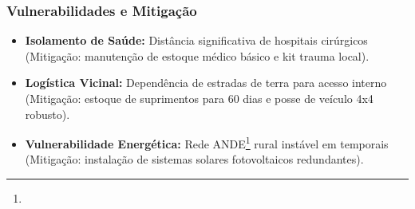 \subsubsection{Vulnerabilidades e
Mitigação}

\begin{itemize}
\tightlist
\item
  \textbf{Isolamento de Saúde:} Distância significativa de hospitais
  cirúrgicos (Mitigação: manutenção de estoque médico básico e kit
  trauma local).
\item
  \textbf{Logística Vicinal:} Dependência de estradas de terra para
  acesso interno (Mitigação: estoque de suprimentos para 60 dias e posse
  de veículo 4x4 robusto).
\item
  \textbf{Vulnerabilidade Energética:} Rede ANDE\footnote{\fineANDE} rural instável em
  temporais (Mitigação: instalação de sistemas solares fotovoltaicos
  redundantes).
\end{itemize}

